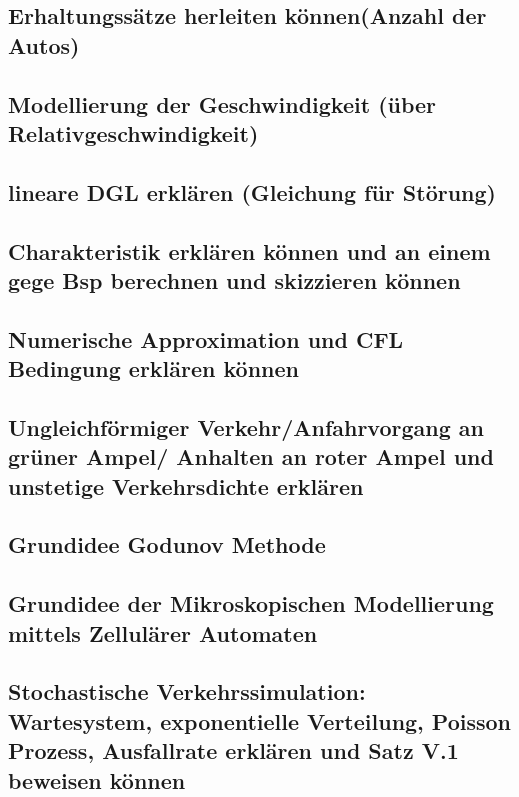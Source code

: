 \documentclass[]{article}
\begin{document}
\subsection*{Erhaltungssätze herleiten können(Anzahl der Autos)}

\subsection*{Modellierung der Geschwindigkeit (über Relativgeschwindigkeit)}

\subsection*{lineare DGL erklären (Gleichung für Störung)}

\subsection*{Charakteristik erklären können und an einem gege Bsp berechnen und skizzieren können}

\subsection*{Numerische Approximation und CFL Bedingung erklären können}

\subsection*{Ungleichförmiger Verkehr/Anfahrvorgang an grüner Ampel/ Anhalten an roter Ampel und unstetige Verkehrsdichte erklären}

\subsection*{Grundidee Godunov Methode}

\subsection*{Grundidee der Mikroskopischen Modellierung mittels Zellulärer Automaten}

\subsection{Stochastische Verkehrssimulation: Wartesystem, exponentielle Verteilung, Poisson Prozess, Ausfallrate erklären und Satz V.1 beweisen können}
\end{document}
